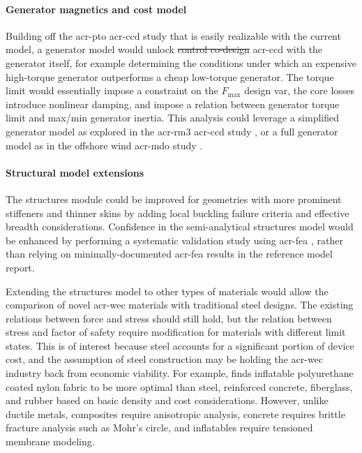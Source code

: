 \documentclass[a4paper,fleqn,colorlinks,unicode,lineno]{cas-dc} %
\makeatletter
\providecommand{\DIFdeltex}[1]{{\protect\color{red}\sout{#1}}} %
\providecommand{\DIFaddbegin}{} %
\providecommand{\DIFaddend}{} %
\providecommand{\DIFdelbegin}{} %
\providecommand{\DIFdelend}{} %
\providecommand{\DIFdel}[1]{\texorpdfstring{\DIFdeltex{#1}}{}} %
\providecommand{\DIFscaledelfig}{0.5}
\newlength{\DIFdelgraphicswidth} %
\newlength{\DIFdelgraphicsheight} %
\providecommand{\DIFaddincludegraphics}[2][]{{\color{blue}\fbox{\DIFOincludegraphics[#1]{#2}}}} %
\providecommand{\DIFdelincludegraphics}[2][]{%
\sbox{\DIFdelgraphicsbox}{\DIFOincludegraphics[#1]{#2}}%
\settoboxwidth{\DIFdelgraphicswidth}{\DIFdelgraphicsbox} %
\settoboxtotalheight{\DIFdelgraphicsheight}{\DIFdelgraphicsbox} %
\scalebox{\DIFscaledelfig}{%
\parbox[b]{\DIFdelgraphicswidth}{\usebox{\DIFdelgraphicsbox}\\[-\baselineskip] \rule{\DIFdelgraphicswidth}{0em}}\llap{\resizebox{\DIFdelgraphicswidth}{\DIFdelgraphicsheight}{%
\setlength{\unitlength}{\DIFdelgraphicswidth}%
\begin{picture}(1,1)%
\thicklines\linethickness{2pt} %
{\color[rgb]{1,0,0}\put(0,0){\framebox(1,1){}}}%
{\color[rgb]{1,0,0}\put(0,0){\line( 1,1){1}}}%
{\color[rgb]{1,0,0}\put(0,1){\line(1,-1){1}}}%
\end{picture}%
}\hspace*{3pt}}} %
} %
\DeclareRobustCommand{\DIFaddbegin}{\DIFOaddbegin \let\includegraphics\DIFaddincludegraphics} %
\DeclareRobustCommand{\DIFaddend}{\DIFOaddend \let\includegraphics\DIFOincludegraphics} %
\DeclareRobustCommand{\DIFdelbegin}{\DIFOdelbegin \let\includegraphics\DIFdelincludegraphics} %
\DeclareRobustCommand{\DIFdelend}{\DIFOaddend \let\includegraphics\DIFOincludegraphics} %
\let\sout@orig\sout %
\renewcommand{\sout}[1]{\ifmmode\text{\sout@orig{\ensuremath{#1}}}\else\sout@orig{#1}\fi} %
\makeatother
\begin{document}
    \paragraph{Generator magnetics and cost model}
    Building off the \gls{acr-pto} \gls{acr-ccd} study that is easily realizable with the current model, a generator model would unlock \DIFdelbegin \DIFdel{control co-design }\DIFdelend \DIFaddbegin \gls{acr-ccd}  \DIFaddend with the generator itself, for example determining the conditions under which an expensive high-torque generator outperforms a cheap low-torque generator.
    The torque limit would essentially impose a constraint on the $F_{\text{max}}$ design var, the core losses introduce nonlinear damping, and impose a relation between generator torque limit and max/min generator inertia.
    This analysis could leverage a simplified generator model as explored in the \gls{acr-rm3} \gls{acr-ccd} study \citep{anderson_re-imagining_2024}, or a full generator model as in the offshore wind \gls{acr-mdo} study \citep{barter_beyond_2023}.

    \paragraph{Structural model extensions}
    The structures module could be improved for geometries with more prominent stiffeners and thinner skins by adding local buckling failure criteria and effective breadth considerations.
    Confidence in the semi-analytical structures model would be enhanced by performing a systematic validation study using \gls{acr-fea} , rather than relying on minimally-documented \gls{acr-fea} results in the reference model report.

    Extending the structures model to other types of materials would allow the comparison of novel \gls{acr-wec} materials with traditional steel designs.
    The existing relations between force and stress should still hold, but the relation between stress and factor of safety require modification for materials with different limit states.
    This is of interest because steel accounts for a significant portion of device cost, and the assumption of steel construction may be holding the \gls{acr-wec} industry back from economic viability.
    For example, \citet{roberts_bringing_2021} finds inflatable polyurethane coated nylon fabric to be more optimal than steel, reinforced concrete, fiberglass, and rubber based on basic density and cost considerations.
    However, unlike ductile metals, composites require anisotropic analysis, concrete requires brittle fracture analysis such as Mohr's circle, and inflatables require tensioned membrane modeling.
\end{document}
